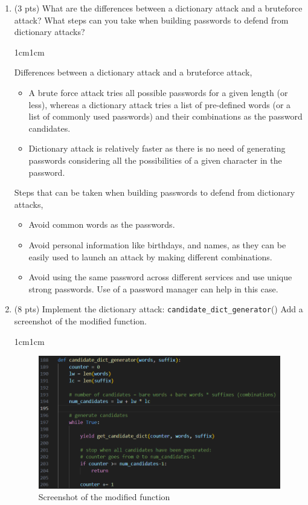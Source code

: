 \documentclass[11pt,letterpaper]{article}
\newenvironment{answer}{\em \color{blue} \begin{adjustwidth}{1cm}{1cm}}{\end{adjustwidth}}
\begin{document}
	\begin{enumerate}
		
		\item (3 pts) What are the differences between a dictionary attack and a bruteforce attack? What steps can you take when building passwords to defend from dictionary attacks?
		
		\begin{answer}
			
			
		Differences between a dictionary attack and a bruteforce attack,
			\begin{itemize}
				\item A brute force attack tries all possible passwords for a given length (or less), whereas a dictionary attack tries a list of pre-defined words (or a list of commonly used passwords) and their combinations as the password candidates.
				
				\item Dictionary attack is relatively faster as there is no need of generating passwords considering all the possibilities of a given character in the password.							
			\end{itemize}
		
		Steps that can be taken when building passwords to defend from dictionary attacks,
		
			\begin{itemize}
				\item Avoid common words as the passwords.
				\item Avoid personal information like birthdays, and names, as they can be easily used to launch an attack by making different combinations.
				\item Avoid using the same password across different services and use unique strong passwords. Use of a password manager can help in this case.
			\end{itemize}
			
		\end{answer}
		
		\item (8 pts) Implement the dictionary attack: \texttt{candidate\_dict\_generator}() Add a screenshot of the modified function. 
		
		\begin{answer}
			
			\begin{figure}[h]
				\centering
				\includegraphics[width=0.8\columnwidth]{images/p1/q22.png}
				\caption{Screenshot of the modified function}
			\end{figure}
			

\end{answer}
\end{enumerate}
\end{document}
